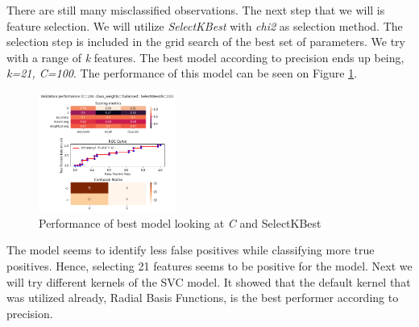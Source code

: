 There are still many misclassified observations. The next step that we will is feature selection. We will utilize \textit{SelectKBest} with \textit{chi2} as selection method. The selection step is included in the grid search of the best set of parameters. We try with a range of \textit{k} features. The best model according to precision ends up being, \textit{k=21, C=100}. The performance of this model can be seen on Figure \ref{fig:results_gridcv_balanced_C_selKBest}.

\begin{figure}[H]
  \centering
  \includegraphics[width=0.4\textwidth]{../project/images/results_gridcv_balanced-C-selectKBest.png}
  \caption{Performance of best model looking at \textit{C} and SelectKBest}
  \label{fig:results_gridcv_balanced_C_selKBest}
\end{figure}

The model seems to identify less false positives while classifying more true positives. Hence, selecting 21 features seems to be positive for the model. Next we will try different kernels of the SVC model. It showed that the default kernel that was utilized already, Radial Basis Functions, is the best performer according to precision.     



